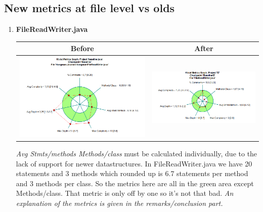 \documentclass{article}
\begin{document}
\subsection{New metrics at file level vs olds} 
\begin{enumerate}
	\item
	\textbf{FileReadWriter.java\newline}
	\begin{tabulary}{0.5\textwidth}{| c | c |}
	\hline
	 Before & After \\ \hline
	\includegraphics[scale=0.3]{FileReadWriter-kiviat-before.png} & \includegraphics[scale=0.4]{Kiviat-filereadwriter-after.png} \\ \hline
	\end{tabulary}
	\vspace{0.1cm}
	\newline
	\textit{Avg Stmts/methods Methods/class} must be calculated individually, due to the lack of support for newer datastructures. In FileReadWriter.java we have 20 statements and 3 methods which  rounded up is 6.7 statements per method and 3 methods per class. So the metrics here are all in the green area except Methods/class. That metric is only off by one so it's not that bad. \textit{An explanation of the metrics is given in the remarks/conclusion part.}

\end{enumerate}
\end{document}
